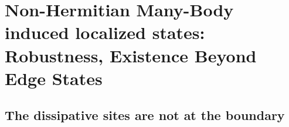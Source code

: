 \documentclass[longbibliography, aps, prx, amsmath, amssymb, amsfonts, twocolumn,superscriptaddress, footinbib]{revtex4-1}
\begin{document}
	\appendix

	\section{Non-Hermitian Many-Body induced localized states: Robustness, Existence Beyond Edge States\label{sec:NHMBL}}

	\subsection{The dissipative sites are not at the boundary}

\end{document}
